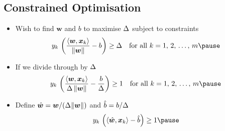 \begin{slide}
\section[-1]{Constrained Optimisation}

\begin{PauseHighLight}
  \begin{itemize}
  \item Wish to find $\bm{w}$ and $b$ to maximise $\Delta$ subject to
    constraints
    \begin{align*}
      y_k\,\left(\frac{\inner{\bm{w}}{\bm{x}_k}}{\| \bm{w} \|} - b\right)
      \geq \margin
      \quad \mbox{for all $k=1,\,2,\,\ldots,\,m$}\pause
    \end{align*}
  \item If we divide through by $\Delta$
    \begin{align*}
       y_k\,\left(\frac{\inner{\bm{w}}{\bm{x}_k}}{\margin\, \| \bm{w} \|} -
      \frac{b}{\margin}\right) \geq 1
      \quad \mbox{for all $k=1,\,2,\,\ldots,\,m$}\pause
    \end{align*}
  \item Define $\hat{\bm{w}}=\bm{w}/(\Delta\|\bm{w}\|)$ and
    $\hat{b}=b/\Delta$
    \begin{align*}
       y_k\,\left(\inner{\hat{\bm{w}}}{\bm{x}_k} - \hat{b}\right) \geq 1\pause
    \end{align*}
  \end{itemize}
\end{PauseHighLight}

\end{slide}


